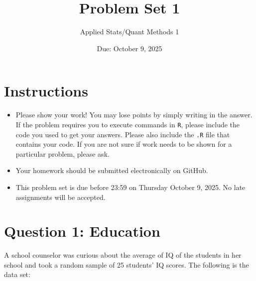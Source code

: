 \documentclass[12pt,letterpaper]{article}
\title{Problem Set 1}
\date{Due: October 9, 2025}
\author{Applied Stats/Quant Methods 1}
\begin{document}
	\maketitle
	
	\section*{Instructions}
	\begin{itemize}
	\item Please show your work! You may lose points by simply writing in the answer. If the problem requires you to execute commands in \texttt{R}, please include the code you used to get your answers. Please also include the \texttt{.R} file that contains your code. If you are not sure if work needs to be shown for a particular problem, please ask.
\item Your homework should be submitted electronically on GitHub.
\item This problem set is due before 23:59 on Thursday October 9, 2025. No late assignments will be accepted.
	\end{itemize}
	
	\vspace{1cm}
	\section*{Question 1: Education}

A school counselor was curious about the average of IQ of the students in her school and took a random sample of 25 students' IQ scores. The following is the data set:\\
\vspace{.5cm}

  

\vspace{1cm}
\end{document}
